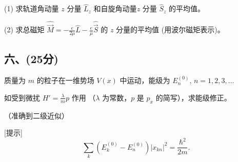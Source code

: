 (1) 求轨道角动量 $z$ 分量 $\hat{L}_z$ 和自旋角动量$z$ 分量 $\hat{S}_z$ 的平均值。

(2) 求总磁矩 $\hat{\vec M} = -\frac{e}{2\mu} \hat{L} - \frac{e}{\mu} \hat{\vec S}$ 的 $z$ 分量的平均值 (用波尔磁矩表示)。
\subsection{六、(25分)}
质量为 $m$ 的粒子在一维势场 $V(x)$ 中运动，能级为 $E_n^{(0)}$, $n = 1, 2, 3, \ldots$

如受到微扰 $H' = \frac{\lambda}{m} p$ 作用 （$\lambda$ 为常数，$p$ 是 $p_x$ 的简写），求能级修正。

（准确到二级近似）

[提示] $$\quad \sum_k \left( E_k^{(0)} - E_n^{(0)} \right) \left| x_{kn} \right|^2 = \frac{\hbar^2}{2m}.~$$